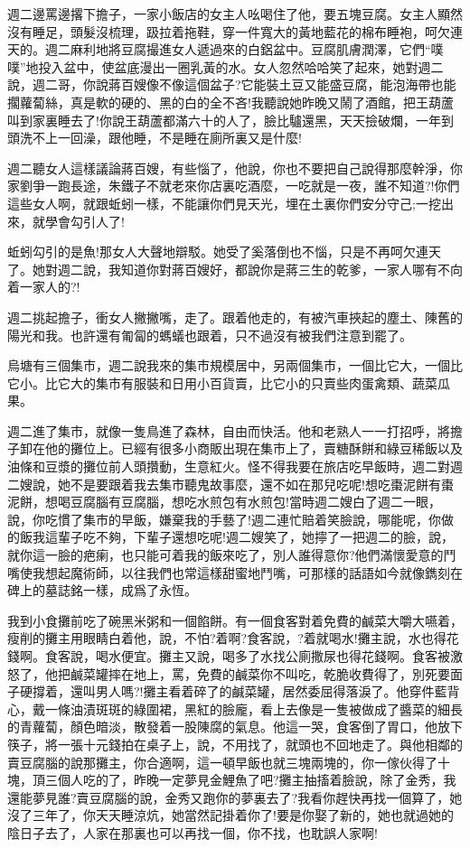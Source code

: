 \documentclass[a6paper]{article}
\begin{document}
週二邊罵邊撂下擔子，一家小飯店的女主人吆喝住了他，要五塊豆腐。女主人顯然沒有睡足，頭髮沒梳理，趿拉着拖鞋，穿一件寬大的黃地藍花的棉布睡袍，呵欠連天的。週二麻利地將豆腐撮進女人遞過來的白鋁盆中。豆腐肌膚潤澤，它們“噗噗”地投入盆中，使盆底漫出一圈乳黃的水。女人忽然哈哈笑了起來，她對週二說，週二哥，你說蔣百嫂像不像這個盆子?它能裝土豆又能盛豆腐，能泡海帶也能擱蘿蔔絲，真是軟的硬的、黑的白的全不吝!我聽說她昨晚又鬧了酒館，把王葫蘆叫到家裏睡去了!你說王葫蘆都滿六十的人了，臉比驢還黑，天天撿破爛，一年到頭洗不上一回澡，跟他睡，不是睡在廁所裏又是什麼!

週二聽女人這樣議論蔣百嫂，有些惱了，他說，你也不要把自己說得那麼幹淨，你家劉爭一跑長途，朱鐵子不就老來你店裏吃酒麼，一吃就是一夜，誰不知道?!你們這些女人啊，就跟蚯蚓一樣，不能讓你們見天光，埋在土裏你們安分守己;一挖出來，就學會勾引人了!

蚯蚓勾引的是魚!那女人大聲地辯駁。她受了奚落倒也不惱，只是不再呵欠連天了。她對週二說，我知道你對蔣百嫂好，都說你是蔣三生的乾爹，一家人哪有不向着一家人的?!

週二挑起擔子，衝女人撇撇嘴，走了。跟着他走的，有被汽車挾起的塵土、陳舊的陽光和我。也許還有匍匐的螞蟻也跟着，只不過沒有被我們注意到罷了。

烏塘有三個集市，週二說我來的集市規模居中，另兩個集市，一個比它大，一個比它小。比它大的集市有服裝和日用小百貨賣，比它小的只賣些肉蛋禽類、蔬菜瓜果。

週二進了集市，就像一隻鳥進了森林，自由而快活。他和老熟人一一打招呼，將擔子卸在他的攤位上。已經有很多小商販出現在集市上了，賣糖酥餅和綠豆稀飯以及油條和豆漿的攤位前人頭攢動，生意紅火。怪不得我要在旅店吃早飯時，週二對週二嫂說，她不是要跟着我去集市聽鬼故事麼，還不如在那兒吃呢!想吃棗泥餅有棗泥餅，想喝豆腐腦有豆腐腦，想吃水煎包有水煎包!當時週二嫂白了週二一眼，說，你吃慣了集市的早飯，嫌棄我的手藝了!週二連忙賠着笑臉說，哪能呢，你做的飯我這輩子吃不夠，下輩子還想吃呢!週二嫂笑了，她擰了一把週二的臉，說，就你這一臉的疤瘌，也只能可着我的飯來吃了，別人誰得意你?他們滿懷愛意的鬥嘴使我想起魔術師，以往我們也常這樣甜蜜地鬥嘴，可那樣的話語如今就像鐫刻在碑上的墓誌銘一樣，成爲了永恆。

我到小食攤前吃了碗黑米粥和一個餡餅。有一個食客對着免費的鹹菜大嚼大嚥着，瘦削的攤主用眼睛白着他，說，不怕?着啊?食客說，?着就喝水!攤主說，水也得花錢啊。食客說，喝水便宜。攤主又說，喝多了水找公廁撒尿也得花錢啊。食客被激怒了，他把鹹菜罐摔在地上，罵，免費的鹹菜你不叫吃，乾脆收費得了，別死要面子硬撐着，還叫男人嗎?!攤主看着碎了的鹹菜罐，居然委屈得落淚了。他穿件藍背心，戴一條油漬斑斑的綠圍裙，黑紅的臉龐，看上去像是一隻被做成了醬菜的細長的青蘿蔔，顏色暗淡，散發着一股陳腐的氣息。他這一哭，食客倒了胃口，他放下筷子，將一張十元錢拍在桌子上，說，不用找了，就頭也不回地走了。與他相鄰的賣豆腐腦的說那攤主，你合適啊，這一頓早飯也就三塊兩塊的，你一傢伙得了十塊，頂三個人吃的了，昨晚一定夢見金鯉魚了吧?攤主抽搐着臉說，除了金秀，我還能夢見誰?賣豆腐腦的說，金秀又跑你的夢裏去了?我看你趕快再找一個算了，她沒了三年了，你天天睡涼炕，她當然記掛着你了!要是你娶了新的，她也就過她的陰日子去了，人家在那裏也可以再找一個，你不找，也耽誤人家啊!
\end{document}
